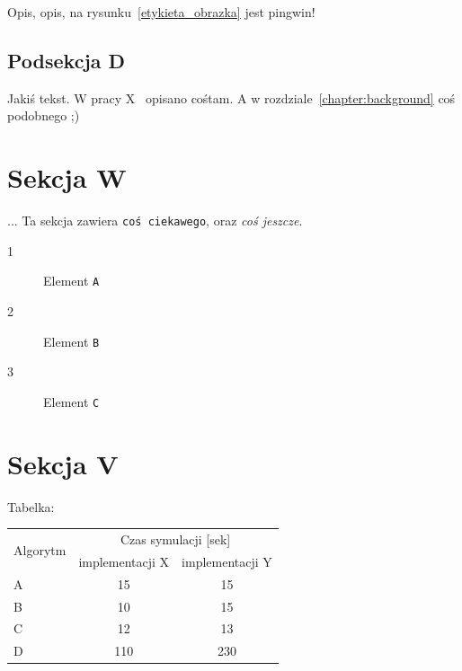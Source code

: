 Opis, opis, na rysunku~\ref{etykieta_obrazka} jest pingwin!

\subsection{Podsekcja D}

Jakiś tekst. W pracy X~\cite{praca_x} opisano cośtam.
A w rozdziale~\ref{chapter:background} coś podobnego ;)

\section{Sekcja W}
\label{sec:sekcja_w}

...
Ta sekcja zawiera \texttt{coś ciekawego}, oraz \textit{coś jeszcze}.

\begin{description}
  \item[1] Element \texttt{A}
  \item[2] Element \texttt{B}
  \item[3] Element \texttt{C}
\end{description}

\section{Sekcja V}
\label{sec:sekcja_v}

Tabelka:
\begin{center}
  \begin{tabular}{ | l || c | c | }
    \hline
    \multirow{2}{*}{Algorytm} & \multicolumn{2}{|c|}{Czas symulacji [sek]} \\
     & implementacji X & implementacji Y \\
    \hline \hline
    A & 15 & 15 \\
    \hline
    B & 10 & 15 \\
    \hline
    C & 12 & 13 \\
    \hline
    D & 110 & 230 \\
    \hline
  \end{tabular}
\end{center}

